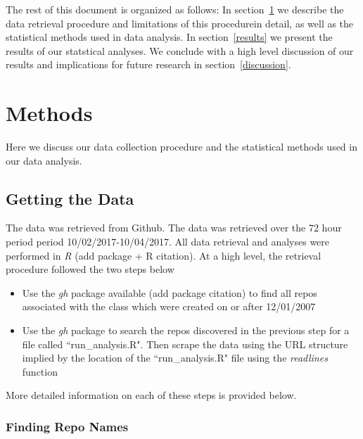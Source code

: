 \documentclass[12pt]{article}\usepackage[]{graphicx}\usepackage[]{color}
\begin{document}
The rest of this document is organized as follows: In section~\ref{methods} we describe the data retrieval procedure and 
limitations of this procedurein detail, as well as the statistical methods used in data analysis. 
In section~\ref{results} we present the results of our statstical analyses. 
We conclude with a high level discussion of our results and implications for future research in section~\ref{discussion}.




\section{Methods}
\label{methods}

Here we discuss our data collection procedure and the statistical methods used in our data analysis.



\subsection{Getting the Data}

The data was retrieved from Github. 
The data was retrieved over the 72 hour period period 10/02/2017-10/04/2017.
All data retrieval and analyses were performed in {\it R} ({\color{red}add package + R citation}).
At a high level, the retrieval procedure followed the two steps below 

\begin{itemize} 
 \item Use the {\it gh} package available ({\color{red}add package citation}) 
to find all repos associated with the class which were created on or after 12/01/2007
 \item Use the {\it gh} package to search the repos discovered in the previous step for a file called ``run\_analysis.R". Then 
 scrape the data using the URL structure implied by the location of the ``run\_analysis.R" file using the 
 {\it readlines} function
 \end{itemize}

More detailed information on each of these steps is provided below.

\subsubsection{Finding Repo Names}
\end{document}
